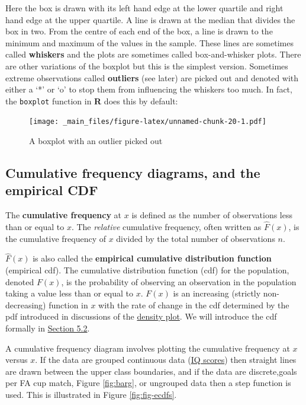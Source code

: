 \documentclass[
]{book}
\begin{document}
\newpage

Here the box is drawn with its left hand edge at the lower quartile
and right hand edge at the upper quartile. A line is drawn at the median
that divides the box in two. From the centre of each end of the box, a
line is drawn to the minimum and maximum of the values in the sample.
These lines are sometimes called \textbf{whiskers} and the plots are
sometimes called box-and-whisker plots. There are other variations of
the boxplot but this is the simplest version. Sometimes
extreme observations called \textbf{outliers} (see later) are picked out and denoted
with either a `*' or `o' to stop them from influencing the whiskers too
much. In fact, the \texttt{boxplot} function in \textbf{R} does this by default:

\begin{figure}
\centering
\texttt{[image: \_main\_files/figure-latex/unnamed-chunk-20-1.pdf]}
\caption{\label{fig:unnamed-chunk-20}A boxplot with an outlier picked out}
\end{figure}

\hypertarget{visual_plot_cdf}{%
\subsection{\texorpdfstring{{\textbf{Cumulative frequency diagrams, and the empirical CDF}}}{Cumulative frequency diagrams, and the empirical CDF}}\label{visual_plot_cdf}}

The \textbf{cumulative frequency} at \(x\) is defined as the number of
observations less than or equal to \(x\). The \emph{relative} cumulative
frequency, often written as \(\hat{F}(x)\), is the cumulative frequency of \(x\) divided by the total number of
observations \(n\).

\(\hat{ F}(x)\) is also called the \textbf{empirical cumulative distribution
function} (empirical cdf). The cumulative distribution function (cdf) for the population, denoted \(F(x)\), is the probability of observing an observation in the population taking a value less than or equal to \(x\). \(F(x)\) is an increasing (strictly non-decreasing) function in \(x\) with the rate of change in the cdf determined by the pdf introduced in discussions of the \protect\hyperlink{visual_plot_density}{density plot}.
We will introduce the cdf formally in \protect\hyperlink{rv:des}{Section 5.2}.

A cumulative frequency diagram involves plotting the cumulative
frequency at \(x\) versus \(x\). If the data are grouped continuous data (\protect\hyperlink{example007}{IQ scores})
then straight lines are drawn between the upper class boundaries, and if
the data are discrete,goals per FA cup match, Figure \ref{fig:barg}, or ungrouped data then a step function is used. This is illustrated in Figure \ref{fig:fig-ecdfs}.
\end{document}
